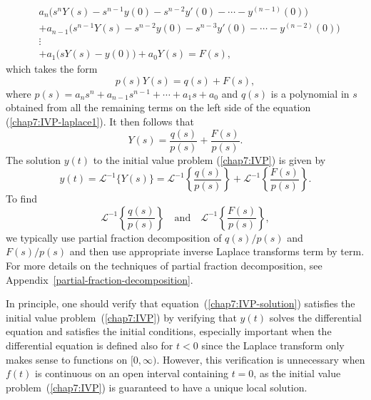 \begin{equation}\label{chap7:IVP-laplace1}
	\begin{split}
	&a_n\big(s^n Y(s) - s^{n-1}y(0) - s^{n-2}y'(0) - \cdots - y^{(n-1)}(0)\big)\\
	&+a_{n-1}\big(s^{n-1} Y(s) - s^{n-2}y(0) - s^{n-3}y'(0) - \cdots - y^{(n-2)}(0)\big)\\
	&\vdots\\
	&+a_1\big(sY(s)- y(0)\big) + a_0Y(s)= F(s),
	\end{split}
\end{equation}
which takes the form
\begin{equation*}\label{chap7:IVP-laplace2}
	p(s)Y(s)= q(s) +F(s),
\end{equation*}
where  $p(s) = a_ns^n+a_{n-1}s^{n-1} + \cdots+ a_1s+a_0$ and $q(s)$ is a polynomial in $s$ obtained from  all the remaining terms on the left side of the equation (\ref{chap7:IVP-laplace1}).
It then follows that 
\begin{equation*}\label{chap7:IVP-laplace2}
Y(s)= \frac{q(s)}{p(s)} +\frac{F(s)}{p(s)}.
\end{equation*}
The solution $y(t)$ to the initial value problem (\ref{chap7:IVP}) is given by 
\begin{equation}\label{chap7:IVP-solution}
	y(t) = \mathscr{L}^{-1}\{Y(s)\} =\mathscr{L}^{-1}\left\{\frac{q(s)}{p(s)}\right\} +\mathscr{L}^{-1}\left\{\frac{F(s)}{p(s)}\right\}.
	\end{equation}
	To find \[\mathscr{L}^{-1}\left\{\frac{q(s)}{p(s)}\right\} \quad\text{and}\quad\mathscr{L}^{-1}\left\{\frac{F(s)}{p(s)}\right\},\]   we typically use partial fraction decomposition of  ${q(s)}/{p(s)}$ and ${F(s)}/{p(s)}$  and then use appropriate inverse Laplace transforms term by term. For more details on the techniques of partial fraction decomposition, see Appendix~\ref{partial-fraction-decomposition}.
	

In principle, one should verify that equation~(\ref{chap7:IVP-solution}) satisfies the initial value problem~(\ref{chap7:IVP}) by verifying that \( y(t) \) solves the differential equation and satisfies the initial conditions, especially important when the differential equation is defined also for \( t < 0 \) since the Laplace transform only makes sense to functions on \([0, \infty)\). However, this verification is unnecessary when \(f(t)\) is continuous on an open interval containing \( t = 0 \), as the initial value problem~(\ref{chap7:IVP}) is guaranteed to have a unique local solution.

